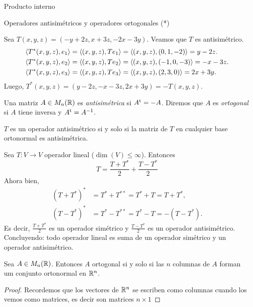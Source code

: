 \begin{chapter}{Producto interno}
\begin{section}{Operadores antisim\'etricos y operadores ortogonales (*)}
        \begin{ejemplo*}
            Sea $T(x,y,z) = (-y+2z,x+3z,-2x-3y)$. Veamos que $T$ es antisimétrico. 
            \begin{align*}
                \langle T^*(x,y,z),e_1 \rangle &= \langle (x,y,z), Te_1 \rangle = \langle (x,y,z),(0,1,-2) \rangle = y -2z. \\
                \langle T^*(x,y,z),e_2 \rangle &= \langle (x,y,z), Te_2 \rangle = \langle (x,y,z),(-1,0,-3) \rangle = -x -3z. \\	
                \langle T^*(x,y,z),e_3 \rangle &= \langle (x,y,z), Te_3 \rangle = \langle (x,y,z),(2,3,0) \rangle = 2x+3y. 
            \end{align*}
            Luego, $T^*(x,y,z) = (y-2z,-x-3z,2x+3y) = -T(x,y,z)$.	
        \end{ejemplo*}
            
        \begin{definicion}
            Una matriz  $A \in M_{n}(\mathbb R)$  es \textit{antisimétrica} si $A^{{\operatorname{t}}}= -A$. Diremos que  $A$  es \textit{ortogonal} si $A$ tiene inversa y $A^{{\operatorname{t}}}=A^{-1}$.
        \end{definicion}	
            
        \begin{ejercicio*} $T$  es un operador antisimétrico si y solo si la matriz de $T$ en cualquier base ortonormal es antisimétrica.
        
            
        \end{ejercicio*}
        
        \begin{obs*}
            Sea $T:V\to V$ operador lineal ($\dim(V)\le \infty$). Entonces 
            $$
            T = \frac{T+T^*}{2} + \frac{T-T^*}2
            $$ 
            Ahora bien, 
            \begin{align*}
                (T+T^*)^* &= T^* + T^{**} =T^* + T = T+T^*, \\
                (T-T^*)^* &= T^* - T^{**} =T^* - T = -(T-T^*).
            \end{align*}
         Es decir, $\displaystyle{\frac{T+T^*}{2}}$  es un  operador simétrico y  $\displaystyle{\frac{T-T^*}{2}}$ es un operador antisimétrico. Concluyendo: todo operador lineal es suma de un operador simétrico y un operador antisimétrico.  
        \end{obs*}
            
        
        
        \begin{proposicion} Sea $A \in  M_{n}(\mathbb R)$. Entonces $A$ ortogonal si y solo si  las $n$ columnas de $A$ forman um conjunto ortonormal en $\mathbb R^n$. 
        \end{proposicion} 
        \begin{proof}
            Recordemos que los vectores de $\mathbb R^n$ se escriben como columnas cuando los vemos como matrices,  es decir son matrices $n \times 1$
            

\end{proof}
\end{section}
\end{chapter}
